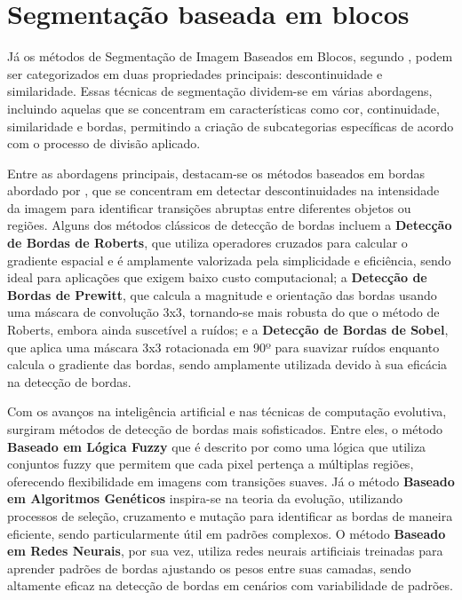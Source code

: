 \section{Segmentação baseada em blocos}

Já os métodos de Segmentação de Imagem Baseados em Blocos, segundo , podem ser categorizados em duas propriedades principais: descontinuidade e similaridade. Essas técnicas de segmentação dividem-se em várias abordagens, incluindo aquelas que se concentram em características como cor, continuidade, similaridade e bordas, permitindo a criação de subcategorias específicas de acordo com o processo de divisão aplicado.

Entre as abordagens principais, destacam-se os métodos baseados em bordas abordado por , que se concentram em detectar descontinuidades na intensidade da imagem para identificar transições abruptas entre diferentes objetos ou regiões. Alguns dos métodos clássicos de detecção de bordas incluem a \textbf{Detecção de Bordas de Roberts}, que utiliza operadores cruzados para calcular o gradiente espacial e é amplamente valorizada pela simplicidade e eficiência, sendo ideal para aplicações que exigem baixo custo computacional; a \textbf{Detecção de Bordas de Prewitt}, que calcula a magnitude e orientação das bordas usando uma máscara de convolução 3x3, tornando-se mais robusta do que o método de Roberts, embora ainda suscetível a ruídos; e a \textbf{Detecção de Bordas de Sobel}, que aplica uma máscara 3x3 rotacionada em 90º para suavizar ruídos enquanto calcula o gradiente das bordas, sendo amplamente utilizada devido à sua eficácia na detecção de bordas.

Com os avanços na inteligência artificial e nas técnicas de computação evolutiva, surgiram métodos de detecção de bordas mais sofisticados. Entre eles, o método \textbf{Baseado em Lógica Fuzzy} que é descrito por  como uma lógica que utiliza conjuntos fuzzy que permitem que cada pixel pertença a múltiplas regiões, oferecendo flexibilidade em imagens com transições suaves. Já o método \textbf{Baseado em Algoritmos Genéticos} inspira-se na teoria da evolução, utilizando processos de seleção, cruzamento e mutação para identificar as bordas de maneira eficiente, sendo particularmente útil em padrões complexos. O método \textbf{Baseado em Redes Neurais}, por sua vez, utiliza redes neurais artificiais treinadas para aprender padrões de bordas ajustando os pesos entre suas camadas, sendo altamente eficaz na detecção de bordas em cenários com variabilidade de padrões. 

